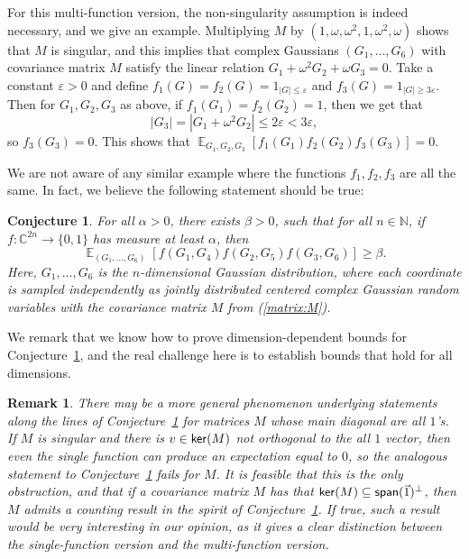 \documentclass[10pt,a4paper]{amsart}
\newtheorem{conj}[thm]{Conjecture}
\newtheorem{remark}[thm]{Remark}
\newcommand\card[1]{\left| {#1} \right|}
\newcommand\Expect[2]{{\mathop{\mathbb{E}}_{#1}\left[ {#2} \right]}}
\newcommand\eps{\varepsilon}
\renewcommand\geq{\geqslant}
\renewcommand\leq{\leqslant}
\begin{document}
For this multi-function version, the non-singularity assumption is indeed necessary, and we give an example. Multiplying $M$ by $(1,\omega,\omega^2,1,\omega^2,\omega)$ shows that $M$ is singular, and this implies that complex Gaussians $(G_1,\ldots,G_6)$ with covariance matrix $M$ satisfy the linear relation $G_1+\omega^2 G_2 + \omega G_3 = 0$. Take a constant $\eps>0$ and define $f_1(G)=f_2(G) = 1_{\card{G}\leq \eps}$ and 
$f_3(G) = 1_{\card{G}\geq 3\eps}$. Then for $G_1,G_2,G_3$ as above, if $f_1(G_1)=f_2(G_2)=1$, then we get that
\[
\card{G_3}=\card{G_1+\omega^2 G_2}\leq 2\eps< 3\eps,
\]
so $f_3(G_3) = 0$. This shows that $\Expect{G_1,G_2,G_3}{f_1(G_1)f_2(G_2)f_3(G_3)} = 0$.

We are not aware of any similar example where the functions $f_1,f_2,f_3$ are all the same. In fact, we believe the following statement should be true:
\begin{conj}\label{conj:equil_triangle}
    For all $\alpha>0$, there exists $\beta>0$, such that for all $n\in\mathbb{N}$, if $f\colon \mathbb{C}^{2n}\to\{0,1\}$ has measure at least $\alpha$, then
    \[
    \Expect{(G_1,\ldots,G_6)}{f(G_1,G_4)f(G_2,G_5)f(G_3,G_6)}\geq \beta.
    \]
    Here, $G_1,\ldots,G_6$ is the $n$-dimensional Gaussian distribution, where each coordinate is sampled independently as jointly distributed centered complex Gaussian random variables with the covariance matrix $M$ from (\ref{matrix:M}).
\end{conj}
We remark that we know how to prove dimension-dependent bounds for Conjecture~\ref{conj:equil_triangle}, and the real challenge here is to establish bounds that hold for all dimensions. 

\begin{remark}
    There may be a more general phenomenon underlying statements along the lines of Conjecture~\ref{conj:equil_triangle} for matrices $M$ whose main diagonal are all $1$'s. If $M$ is singular and there is $v\in {\sf ker}(M)$ not orthogonal to the all $1$ vector, then even the single function can produce an expectation equal to $0$, so the analogous statement to Conjecture~\ref{conj:equil_triangle} fails for $M$. It is feasible that this is the only obstruction, and that if a covariance matrix $M$ has that ${\sf ker}(M)\subseteq{\sf span}(\vec{1})^{\bot}$, then $M$ admits a counting result in the spirit of Conjecture~\ref{conj:equil_triangle}. If true, such a result would be very interesting in our opinion, as it gives a clear distinction between the single-function version and the multi-function version.
\end{remark}
\end{document}
